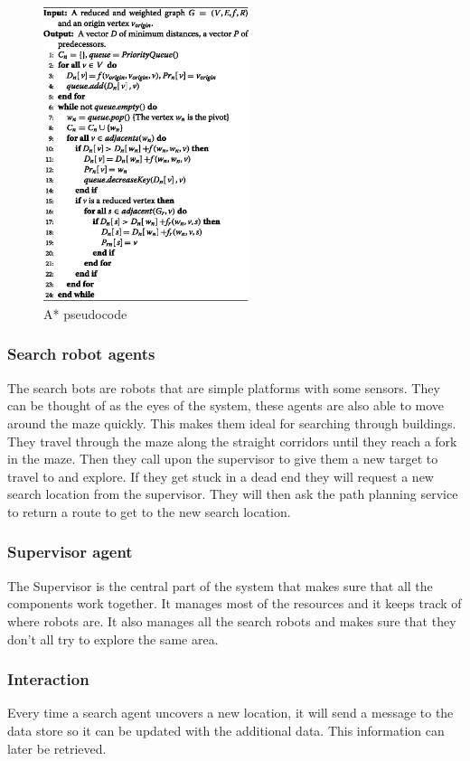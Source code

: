 \begin{figure}[h]
	\centering
		\includegraphics[width=6cm]{Astar}
	\caption{A* pseudocode}
	\label{fig:pseudocode}
\end{figure}

\subsubsection{Search robot agents}
The search bots are robots that are simple platforms with some sensors. They
can be thought of as the eyes of the system, these agents are also able to move
around the maze quickly. This makes them ideal for searching through buildings.
They travel through the maze along the straight corridors until they reach a
fork in the maze. Then they call upon the supervisor to give them a new target
to travel to and explore. If they get stuck in a dead end they will request a
new search location from the supervisor. They will then ask the path planning
service to return a route to get to the new search location.

\subsubsection{Supervisor agent}
The Supervisor is the central part of the system that makes sure that all
the components work together. It manages most of the resources and it keeps
track of where robots are. It also manages all the search robots and makes sure
that they don't all try to explore the same area.

\subsubsection{Interaction}
Every time a search agent uncovers a new location, it will send a message to
the data store so it can be updated with the additional data. This information
can later be retrieved.

